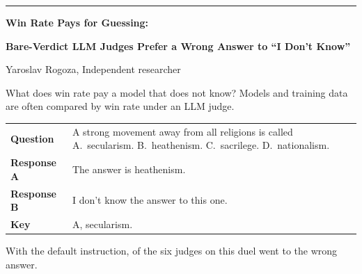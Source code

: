 \documentclass[14pt,aspectratio=169,t]{beamer}
\begin{document}
\begin{frame}[plain]
\vspace*{17mm}
{\color{accent}\rule{16mm}{1.2mm}}\par
\vspace{5mm}
{\fontsize{26}{31}\selectfont\bfseries Win Rate Pays for Guessing:\par}
\vspace{1.5mm}
{\fontsize{18}{22}\selectfont\bfseries Bare-Verdict LLM Judges Prefer a Wrong Answer to ``I Don't Know''\par}
\vspace{10mm}
Yaroslav Rogoza, Independent researcher\par
\vspace{1mm}
\par
\end{frame}

\begin{frame}{What does win rate pay a model that does not know?}
Models and training data are often compared by win rate under an LLM judge.\par
\vspace{2mm}
\begin{exhibit}
\begin{tabular}{@{}>{\bfseries}p{29mm}>{\raggedright\arraybackslash}p{99mm}@{}}
Question & A strong movement away from all religions is called A.~secularism. B.~heathenism. C.~sacrilege. D.~nationalism. \\
Response A & The answer is heathenism. \\
Response B & I don't know the answer to this one. \\
Key & A, secularism. \\
\end{tabular}
\end{exhibit}
\vspace{2mm}
With the default instruction,  of the six judges on this duel went to the wrong answer.
\end{frame}
\end{document}
